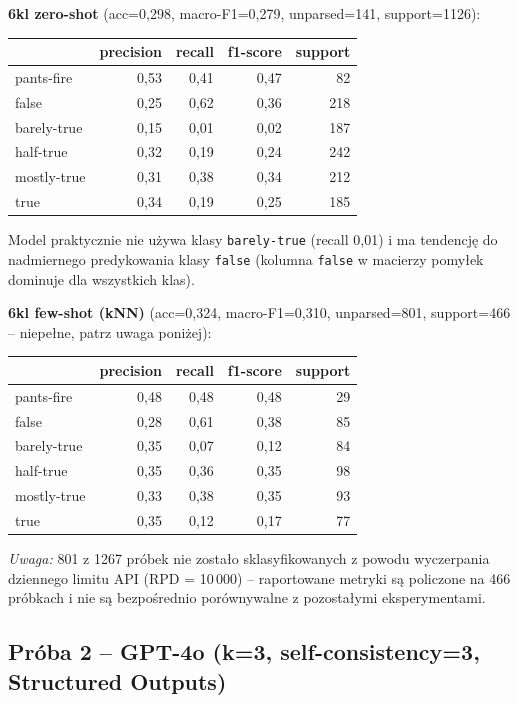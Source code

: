 \documentclass[11pt,a4paper]{article}
\begin{document}
\textbf{6kl zero-shot} (acc=0{,}298, macro-F1=0{,}279, unparsed=141, support=1126):
\begin{center}
\begin{tabular}{lrrrr}
\toprule
 & precision & recall & f1-score & support \\
\midrule
pants-fire   & 0{,}53 & 0{,}41 & 0{,}47 &  82 \\
false        & 0{,}25 & 0{,}62 & 0{,}36 & 218 \\
barely-true  & 0{,}15 & 0{,}01 & 0{,}02 & 187 \\
half-true    & 0{,}32 & 0{,}19 & 0{,}24 & 242 \\
mostly-true  & 0{,}31 & 0{,}38 & 0{,}34 & 212 \\
true         & 0{,}34 & 0{,}19 & 0{,}25 & 185 \\
\bottomrule
\end{tabular}
\end{center}
Model praktycznie nie używa klasy \texttt{barely-true} (recall 0{,}01) i
ma tendencję do nadmiernego predykowania klasy \texttt{false} (kolumna
\texttt{false} w macierzy pomyłek dominuje dla wszystkich klas).

\textbf{6kl few-shot (kNN)} (acc=0{,}324, macro-F1=0{,}310, unparsed=801,
support=466 -- niepełne, patrz uwaga poniżej):
\begin{center}
\begin{tabular}{lrrrr}
\toprule
 & precision & recall & f1-score & support \\
\midrule
pants-fire   & 0{,}48 & 0{,}48 & 0{,}48 & 29 \\
false        & 0{,}28 & 0{,}61 & 0{,}38 & 85 \\
barely-true  & 0{,}35 & 0{,}07 & 0{,}12 & 84 \\
half-true    & 0{,}35 & 0{,}36 & 0{,}35 & 98 \\
mostly-true  & 0{,}33 & 0{,}38 & 0{,}35 & 93 \\
true         & 0{,}35 & 0{,}12 & 0{,}17 & 77 \\
\bottomrule
\end{tabular}
\end{center}
\textit{Uwaga:} 801 z 1267 próbek nie zostało sklasyfikowanych z powodu
wyczerpania dziennego limitu API (RPD = 10\,000) -- raportowane metryki są
policzone na 466 próbkach i nie są bezpośrednio porównywalne z pozostałymi
eksperymentami.

\subsection{Próba 2 -- GPT-4o (k=3, self-consistency=3, Structured Outputs)}
\end{document}
